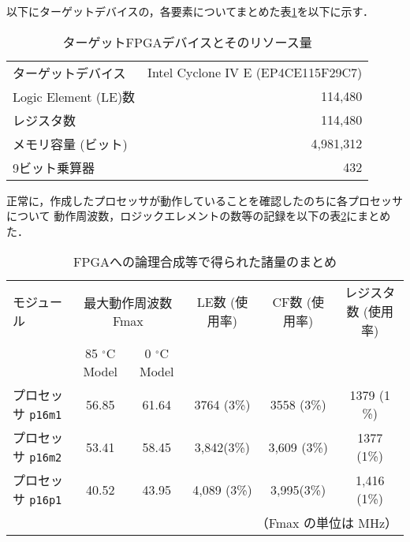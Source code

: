 \documentclass[autodetect-engine,dvi=dvipdfmx,ja=standard,
               a4j,11pt]{bxjsarticle}
\begin{document}
以下にターゲットデバイスの，各要素についてまとめた表\ref{tab:ターゲットFPGAデバイスとそのリソース量}を以下に示す．\\
\begin{table}[hbtp]
    \caption{ターゲットFPGAデバイスとそのリソース量}
    \label{tab:ターゲットFPGAデバイスとそのリソース量}
    \begin{center}
    \begin{tabular}{l|r}
    \hline \hline
    ターゲットデバイス & Intel Cyclone IV E (EP4CE115F29C7) \\
    Logic Element (LE)数 & 114,480 \\
    レジスタ数 & 114,480 \\
    メモリ容量 (ビット) & 4,981,312\\
    9ビット乗算器 & 432 \\
    \hline
    \end{tabular}
    \end{center}
    \end{table}

正常に，作成したプロセッサが動作していることを確認したのちに各プロセッサについて
動作周波数，ロジックエレメントの数等の記録を以下の表\ref{tab:FPGAへの論理合成等で得られた諸量のまとめ}にまとめた．\\
\begin{table}[hbtp]
    \caption{FPGAへの論理合成等で得られた諸量のまとめ}
    \label{tab:FPGAへの論理合成等で得られた諸量のまとめ}
    \begin{center}
    {\small
    \begin{tabular}{l|ccccc}
    \hline
    \hline
    モジュール &
    \multicolumn{2}{c}{最大動作周波数 Fmax} & LE数 (使用率) & 
    CF数 (使用率) & レジスタ数 (使用率)  \\
    & 85 $^\circ$C Model & 0 $^\circ$C Model & & &  \\
    \hline
    プロセッサ \verb|p16m1| & 56.85& 61.64& 3764 (3\%) & 3558 (3\%)&  1379 (1 \%) \\
    プロセッサ \verb|p16m2| & 53.41& 58.45& 3,842(3\%)& 3,609 (3\%)&  1377 (1\%)\\
    プロセッサ \verb|p16p1| & 40.52& 43.95& 4,089 (3\%)& 3,995(3\%) & 1,416 (1\%)\\
    \hline
    \multicolumn{6}{r}{（Fmax の単位は MHz）}
    \end{tabular}
    }
    \end{center}
    \end{table}
\end{document}
